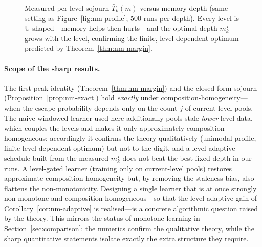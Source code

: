 \documentclass[11pt,a4paper]{article}
\begin{document}
\begin{figure}[ht]
\centering
{}
\caption{Measured per-level sojourn $\bar T_k(m)$ versus memory depth
  (same setting as Figure~\ref{fig:nm-profile}; $500$ runs per depth).  Every
  level is U-shaped---memory helps then hurts---and the optimal depth
  $m_k^\star$ grows with the level, confirming the finite, level-dependent
  optimum predicted by Theorem~\ref{thm:nm-margin}.}
\label{fig:nm-sojourn}
\end{figure}

\paragraph{Scope of the sharp results.}
The first-peak identity (Theorem~\ref{thm:nm-margin}) and the closed-form
sojourn (Proposition~\ref{prop:nm-exact}) hold \emph{exactly} under
composition-homogeneity---when the escape probability depends only on the
count $j$ of current-level pools.  The naive windowed learner used here
additionally pools stale \emph{lower}-level data, which couples the
levels and makes it only approximately composition-homogeneous;
accordingly it confirms the theory qualitatively (unimodal profile,
finite level-dependent optimum) but not to the digit, and a
level-adaptive schedule built from the measured $m_k^\star$ does not beat
the best fixed depth in our runs.  A level-gated learner (training only
on current-level pools) restores approximate composition-homogeneity but,
by removing the staleness bias, also flattens the non-monotonicity.
Designing a single learner that is at once strongly non-monotone and
composition-homogeneous---so that the level-adaptive gain of
Corollary~\ref{cor:nm-adaptive} is realised---is a concrete algorithmic
question raised by the theory.  This mirrors the status of monotone
learning in Section~\ref{sec:comparison}: the numerics confirm the
qualitative theory, while the sharp quantitative statements isolate
exactly the extra structure they require.
\end{document}
